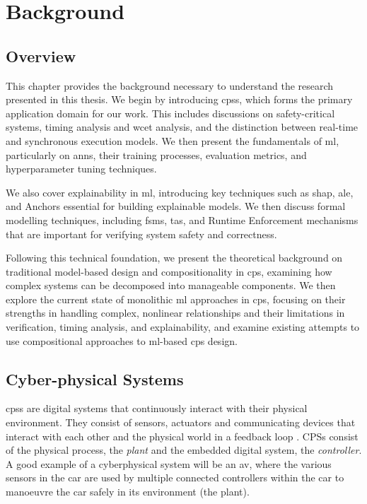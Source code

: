 \chapter{Background}\label{chapter:background}
\glsresetall

\section{Overview}
This chapter provides the background necessary to understand the research presented in this thesis. We begin by introducing \glspl{cps}, which forms the primary application domain for our work. This includes discussions on safety-critical systems, timing analysis and \gls{wcet} analysis, and the distinction between real-time and synchronous execution models. We then present the fundamentals of \gls{ml}, particularly on \glspl{ann}, their training processes, evaluation metrics, and hyperparameter tuning techniques. 

We also cover explainability in \gls{ml}, introducing key techniques such as \gls{shap}, \gls{ale}, and Anchors essential for building explainable models. We then discuss formal modelling techniques, including \glspl{fsm}, \glspl{ta}, and Runtime Enforcement mechanisms that are important for verifying system safety and correctness. 

Following this technical foundation, we present the theoretical background on traditional model-based design and compositionality in \gls{cps}, examining how complex systems can be decomposed into manageable components. We then explore the current state of monolithic \gls{ml} approaches in \gls{cps}, focusing on their strengths in handling complex, nonlinear relationships and their limitations in verification, timing analysis, and explainability, and examine existing attempts to use compositional approaches to \gls{ml}-based \gls{cps} design.


\section{Cyber-physical Systems}

\glspl{cps} are digital systems that continuously interact with their physical environment. They consist of sensors, actuators and communicating devices that interact with each other and the physical world in a feedback loop \cite{alur_principles_2015}. CPSs consist of the physical process, the \emph{plant} and the embedded digital system, the \emph{controller}. A good example of a cyberphysical system will be an  \gls{av}, where the various sensors in the car are used by multiple connected controllers within the car to manoeuvre the car safely in its environment (the plant).

